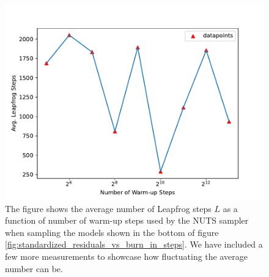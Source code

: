 \begin{figure}[H]
    \centering
    \includegraphics[scale=0.7]{figures/standardized_residuals/effect_of_burnin/avg_burnin_steps_nuts_vs_burn_in_steps.pdf}
    \caption{The figure shows the average number of Leapfrog steps $L$ as a function of number of warm-up steps used by the NUTS sampler when sampling the models shown in the bottom of figure \ref{fig:standardized_residuals_vs_burn_in_steps}. We have included a few more measurements to showcase how fluctuating the average number can be. 
    }
    \label{fig:avg_leapfrog_steps_vs_burn_in}
\end{figure}


